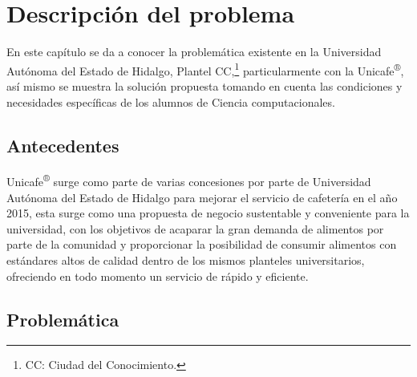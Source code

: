 \chapter{Descripción del problema} \label{Capitulo: Planteamiento}

\begin{large}
\onehalfspacing %

En este capítulo se da a conocer la problemática existente en la Universidad Autónoma del Estado de Hidalgo, Plantel CC,\footnote{CC: Ciudad del Conocimiento.} particularmente con la Unicafe\textsuperscript{®},  así mismo se muestra la solución propuesta tomando en cuenta las condiciones y necesidades específicas de los alumnos de Ciencia computacionales.

\section{Antecedentes}

Unicafe\textsuperscript{®} surge como parte de varias concesiones por parte de Universidad Autónoma del Estado de Hidalgo para mejorar el servicio de cafetería en el año 2015, esta surge como una propuesta de negocio sustentable y conveniente para la universidad, con los objetivos de acaparar la gran demanda de alimentos por parte de la comunidad y proporcionar la posibilidad de consumir alimentos con estándares altos de calidad dentro de los mismos planteles universitarios, ofreciendo en todo momento un servicio de rápido y eficiente.

\section{Problemática}


\end{large}
